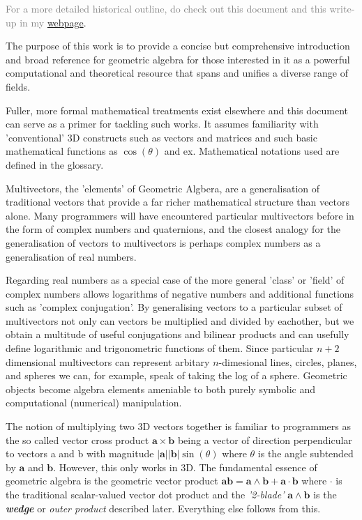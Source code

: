 \documentclass[a4paper]{book}
\numberwithin{equation}{chapter}
\begin{document}
\textcolor{gray}{For a more detailed historical outline, do check out 
this document and this write-up in my \href{https://ar0e.github.io}{webpage}}.

\vspace{\baselineskip}

The purpose of this work is to provide a concise but comprehensive introduction and 
broad reference for 
geometric algebra for those interested in it as a powerful computational and theoretical
resource that spans
and unifies a diverse range of fields.

\vspace{\baselineskip}

Fuller, more formal mathematical treatments exist elsewhere and this 
document can serve as a primer for tackling such works. It assumes familiarity with 
'conventional' 3D 
constructs such as vectors and matrices and such basic mathematical functions as 
$\cos(\theta)$ and ex.  Mathematical notations used are defined in the glossary.

Multivectors, the 'elements' of Geometric Algbera, are a generalisation of traditional vectors that provide a 
far richer mathematical structure than vectors alone. Many programmers will have encountered particular 
multivectors before in the form of complex numbers and quaternions, and the closest analogy for the 
generalisation of vectors to multivectors is perhaps complex numbers as a generalisation of real numbers.

\vspace{\baselineskip}

Regarding real numbers as a special case of the more general 'class' or 'field' of complex numbers allows 
logarithms of negative numbers and additional functions such as 'complex conjugation'. By generalising 
vectors to a particular subset of multivectors not only can vectors be multiplied and divided by eachother,
but we obtain a multitude of useful conjugations and bilinear products and can usefully define logarithmic 
and trigonometric functions of them. Since particular $n+2$ dimensional multivectors can represent arbitary 
$n$-dimesional lines, circles, planes, and spheres we can, for example, speak of taking the log of a sphere. 
Geometric objects become algebra elements ameniable to both purely symbolic and computational (numerical) 
manipulation.

\vspace{\baselineskip}

The notion of multiplying two 3D vectors together is familiar to programmers as the so called vector cross 
product $\mathbf{a}\times \mathbf{b}$ being a vector of direction perpendicular to vectors a and b with magnitude $|\mathbf{a}||\mathbf{b}| \sin(\theta)$ 
where $\theta$ 
is the angle subtended by $\mathbf{a}$ and $\mathbf{b}$. However, this only works in 3D. The fundamental essence of geometric 
algebra is the geometric vector product $\mathbf{ab = a\wedge b +
a \cdot b}$ where $\cdot$ is the traditional scalar-valued vector dot 
product and the \emph{'2-blade'} $\mathbf{a\wedge b}$ is 
the \emph{\textbf{wedge}} or \emph{outer product} described later. Everything else follows from this. 
\end{document}
